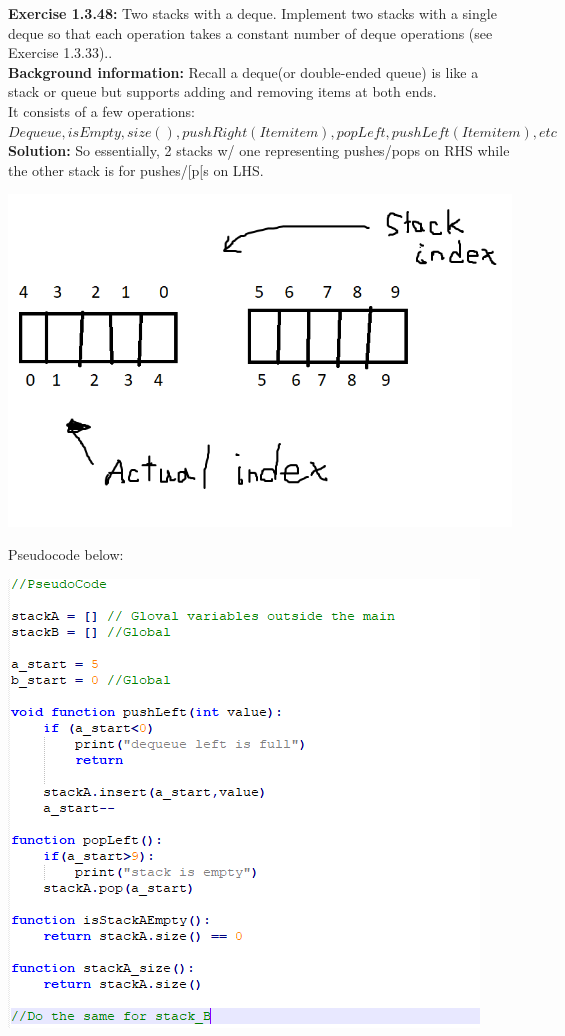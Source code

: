 \documentclass[11pt,fleqn]{article}
\begin{document}
\textbf{Exercise 1.3.48:} Two stacks with a deque. Implement two stacks with a single deque so that each
operation takes a constant number of deque operations (see Exercise 1.3.33)..\\

\textbf{Background information:} Recall a deque(or double-ended queue) is like a stack or queue but supports adding and removing items at both ends.\\

It consists of a few operations:\\ $Dequeue, isEmpty, size(), pushRight(Item item), popLeft, pushLeft(Item item), etc$ \\

\textbf{Solution:} So essentially, 2 stacks w/ one representing pushes/pops on RHS while the other stack is for pushes/[p[s on LHS.


\begin{center}
	\includegraphics[scale = 1]{1.3.48.png}
	\end{center}
	
\newpage

Pseudocode below:

\begin{center}
	\includegraphics[scale = 1]{1.3.48-2.png}
	\end{center}
\end{document}
